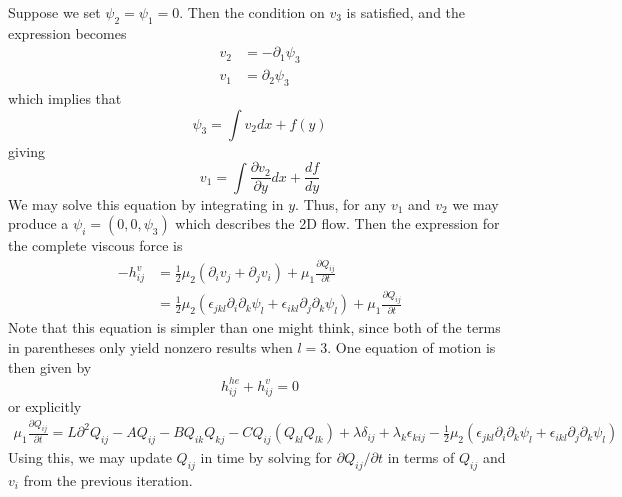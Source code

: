 \documentclass[reqno]{article}
\begin{document}
	Suppose we set $\psi_2 = \psi_1 = 0$. Then the condition on $v_3$ is satisfied, and the expression becomes
	\begin{equation}
	\begin{split}
		v_2 &= -\partial_1 \psi_3 \\
		v_1 &= \partial_2 \psi_3
	\end{split}
	\end{equation}
	which implies that
	\begin{equation}
		\psi_3 = \int v_2 dx + f(y)
	\end{equation}
	giving
	\begin{equation}
		v_1 = \int \frac{\partial v_2}{\partial y} dx + \frac{df}{dy}
	\end{equation}
	We may solve this equation by integrating in $y$. Thus, for any $v_1$ and $v_2$ we may produce a $\psi_i = (0, 0, \psi_3)$ which describes the 2D flow. Then the expression for the complete viscous force is
	\begin{equation}\label{eq:visc-force}
	\begin{split}
		-h^v_{ij} &= \frac{1}{2}\mu_2 (\partial_i v_j + \partial_j v_i) + \mu_1 \frac{\partial Q_{ij}}{\partial t} \\
		&= \frac{1}{2}\mu_2 (\epsilon_{jkl} \partial_i \partial_k \psi_l +  \epsilon_{ikl} \partial_j \partial_k \psi_l) + \mu_1 \frac{\partial Q_{ij}}{\partial t}
	\end{split}
	\end{equation}
	Note that this equation is simpler than one might think, since both of the terms in parentheses only yield nonzero results when $l = 3$. 
	One equation of motion is then given by 
	\begin{equation}
		h^{he}_{ij} + h^{v}_{ij} = 0
	\end{equation}
	or explicitly
	\begin{multline}\label{eq:forceeq}
		\mu_1 \frac{\partial Q_{ij}}{\partial t} = L\partial^2 Q_{ij} - A Q_{ij} - BQ_{ik}Q_{kj} - C Q_{ij} (Q_{kl}Q_{lk}) + \lambda\delta_{ij} + \lambda_k \epsilon_{kij} - \frac{1}{2}\mu_2 (\epsilon_{jkl} \partial_i \partial_k \psi_l +  \epsilon_{ikl} \partial_j \partial_k \psi_l)
	\end{multline}
	Using this, we may update $Q_{ij}$ in time by solving for $\partial Q_{ij}/\partial t$ in terms of $Q_{ij}$ and $v_i$ from the previous iteration.
	
\end{document}

